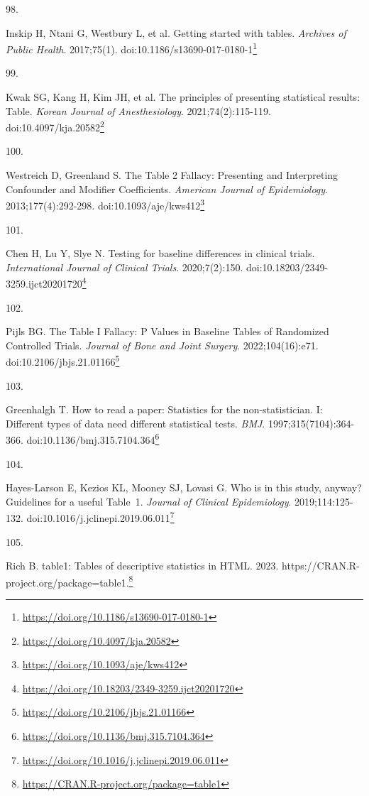 \documentclass[
  a4paper,
]{book}
\newlength{\cslhangindent}
\newlength{\csllabelwidth}
\newlength{\cslentryspacingunit} %
\newenvironment{CSLReferences}[2] %
 {%
  \setlength{\parindent}{0pt}
  \ifodd #1
  \let\oldpar\par
  \def\par{\hangindent=\cslhangindent\oldpar}
  \fi
  \setlength{\parskip}{#2\cslentryspacingunit}
 }%
 {}
\newcommand{\CSLLeftMargin}[1]{\parbox[t]{\csllabelwidth}{#1}}
\newcommand{\CSLRightInline}[1]{\parbox[t]{\linewidth - \csllabelwidth}{#1}\break}
\renewcommand{\href}[2]{#2\footnote{\url{#1}}}
\begin{document}
\begin{CSLReferences}{0}{0}
\leavevmode{}%
\CSLLeftMargin{98. }%
\CSLRightInline{Inskip H, Ntani G, Westbury L, et al. Getting started with tables. \emph{Archives of Public Health}. 2017;75(1). doi:\href{https://doi.org/10.1186/s13690-017-0180-1}{10.1186/s13690-017-0180-1}}

\leavevmode{}%
\CSLLeftMargin{99. }%
\CSLRightInline{Kwak SG, Kang H, Kim JH, et al. The principles of presenting statistical results: Table. \emph{Korean Journal of Anesthesiology}. 2021;74(2):115-119. doi:\href{https://doi.org/10.4097/kja.20582}{10.4097/kja.20582}}

\leavevmode{}%
\CSLLeftMargin{100. }%
\CSLRightInline{Westreich D, Greenland S. The Table 2 Fallacy: Presenting and Interpreting Confounder and Modifier Coefficients. \emph{American Journal of Epidemiology}. 2013;177(4):292-298. doi:\href{https://doi.org/10.1093/aje/kws412}{10.1093/aje/kws412}}

\leavevmode{}%
\CSLLeftMargin{101. }%
\CSLRightInline{Chen H, Lu Y, Slye N. Testing for baseline differences in clinical trials. \emph{International Journal of Clinical Trials}. 2020;7(2):150. doi:\href{https://doi.org/10.18203/2349-3259.ijct20201720}{10.18203/2349-3259.ijct20201720}}

\leavevmode{}%
\CSLLeftMargin{102. }%
\CSLRightInline{Pijls BG. The Table I Fallacy: P Values in Baseline Tables of Randomized Controlled Trials. \emph{Journal of Bone and Joint Surgery}. 2022;104(16):e71. doi:\href{https://doi.org/10.2106/jbjs.21.01166}{10.2106/jbjs.21.01166}}

\leavevmode{}%
\CSLLeftMargin{103. }%
\CSLRightInline{Greenhalgh T. How to read a paper: Statistics for the non-statistician. I: Different types of data need different statistical tests. \emph{BMJ}. 1997;315(7104):364-366. doi:\href{https://doi.org/10.1136/bmj.315.7104.364}{10.1136/bmj.315.7104.364}}

\leavevmode{}%
\CSLLeftMargin{104. }%
\CSLRightInline{Hayes-Larson E, Kezios KL, Mooney SJ, Lovasi G. Who is in this study, anyway? Guidelines for a useful Table~1. \emph{Journal of Clinical Epidemiology}. 2019;114:125-132. doi:\href{https://doi.org/10.1016/j.jclinepi.2019.06.011}{10.1016/j.jclinepi.2019.06.011}}

\leavevmode{}%
\CSLLeftMargin{105. }%
\CSLRightInline{Rich B. table1: Tables of descriptive statistics in HTML. 2023. \href{https://CRAN.R-project.org/package=table1}{https://CRAN.R-project.org/package=table1.}}


\end{CSLReferences}
\end{document}
